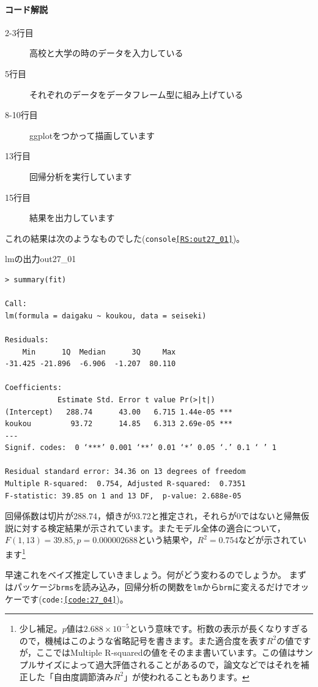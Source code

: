 \documentclass{ltjsarticle}
\begin{document}
\paragraph{コード解説}
\begin{description}
	\item[2-3行目] 高校と大学の時のデータを入力している
	\item[5行目] それぞれのデータをデータフレーム型に組み上げている
	\item[8-10行目] ggplotをつかって描画しています
	\item[13行目] 回帰分析を実行しています
	\item[15行目] 結果を出力しています
\end{description}

これの結果は次のようなものでした(\texttt{console\ref{RS:out27_01}})。
\begin{Rscreen}{lmの出力}{out27_01}
	\begin{verbatim}
> summary(fit)

Call:
lm(formula = daigaku ~ koukou, data = seiseki)

Residuals:
    Min      1Q  Median      3Q     Max 
-31.425 -21.896  -6.906  -1.207  80.110 

Coefficients:
            Estimate Std. Error t value Pr(>|t|)    
(Intercept)   288.74      43.00   6.715 1.44e-05 ***
koukou         93.72      14.85   6.313 2.69e-05 ***
---
Signif. codes:  0 ‘***’ 0.001 ‘**’ 0.01 ‘*’ 0.05 ‘.’ 0.1 ‘ ’ 1

Residual standard error: 34.36 on 13 degrees of freedom
Multiple R-squared:  0.754,	Adjusted R-squared:  0.7351 
F-statistic: 39.85 on 1 and 13 DF,  p-value: 2.688e-05
\end{verbatim}
\end{Rscreen}
回帰係数は切片が288.74，傾きが93.72と推定され，それらが0ではないと帰無仮説に対する検定結果が示されています。またモデル全体の適合について，$F(1,13)=39.85,p=0.000002688$という結果や，$R^2=0.754$などが示されています\footnote{少し補足。$p$値は$2.688\times 10^{-5}$という意味です。桁数の表示が長くなりすぎるので，機械はこのような省略記号を書きます。また適合度を表す$R^2$の値ですが，ここではMultiple R-squaredの値をそのまま書いています。この値はサンプルサイズによって過大評価されることがあるので，論文などではそれを補正した「自由度調節済み$R^2$」が使われることもあります。}

早速これをベイズ推定していきましょう。何がどう変わるのでしょうか。
まずはパッケージ\texttt{brms}を読み込み，回帰分析の関数を\texttt{lm}から\texttt{brm}に変えるだけでオッケーです(\texttt{code:\ref{code:27_04}})。
\end{document}
